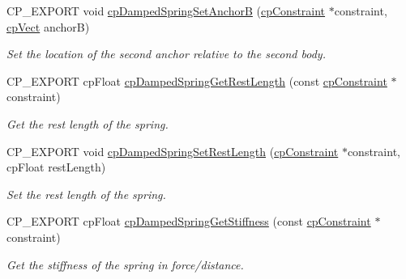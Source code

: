 \begin{DoxyCompactItemize}
\mbox{\label{group__cpDampedSpring_gac4f4180f4657f77a2698e98ab5149c90}} 
C\+P\+\_\+\+E\+X\+P\+O\+RT void \hyperlink{group__cpDampedSpring_gac4f4180f4657f77a2698e98ab5149c90}{cp\+Damped\+Spring\+Set\+AnchorB} (\hyperlink{structcpConstraint}{cp\+Constraint} $\ast$constraint, \hyperlink{structcpVect}{cp\+Vect} anchorB)
\begin{DoxyCompactList}\small\item\em Set the location of the second anchor relative to the second body. \end{DoxyCompactList}\item 
\mbox{\label{group__cpDampedSpring_gaf70dea86936946e0888fb05ff7813b8a}} 
C\+P\+\_\+\+E\+X\+P\+O\+RT cp\+Float \hyperlink{group__cpDampedSpring_gaf70dea86936946e0888fb05ff7813b8a}{cp\+Damped\+Spring\+Get\+Rest\+Length} (const \hyperlink{structcpConstraint}{cp\+Constraint} $\ast$constraint)
\begin{DoxyCompactList}\small\item\em Get the rest length of the spring. \end{DoxyCompactList}\item 
\mbox{\label{group__cpDampedSpring_ga4809ef7ab843a29125daca2153a3960e}} 
C\+P\+\_\+\+E\+X\+P\+O\+RT void \hyperlink{group__cpDampedSpring_ga4809ef7ab843a29125daca2153a3960e}{cp\+Damped\+Spring\+Set\+Rest\+Length} (\hyperlink{structcpConstraint}{cp\+Constraint} $\ast$constraint, cp\+Float rest\+Length)
\begin{DoxyCompactList}\small\item\em Set the rest length of the spring. \end{DoxyCompactList}\item 
\mbox{\label{group__cpDampedSpring_ga4f649481e8d9c0a166e9d9dc26fd1cdc}} 
C\+P\+\_\+\+E\+X\+P\+O\+RT cp\+Float \hyperlink{group__cpDampedSpring_ga4f649481e8d9c0a166e9d9dc26fd1cdc}{cp\+Damped\+Spring\+Get\+Stiffness} (const \hyperlink{structcpConstraint}{cp\+Constraint} $\ast$constraint)
\begin{DoxyCompactList}\small\item\em Get the stiffness of the spring in force/distance. \end{DoxyCompactList}\item 
\mbox{\label{group__cpDampedSpring_gafb0a681c3c2ec31001bd55be1080beda}} 

\end{DoxyCompactItemize}
